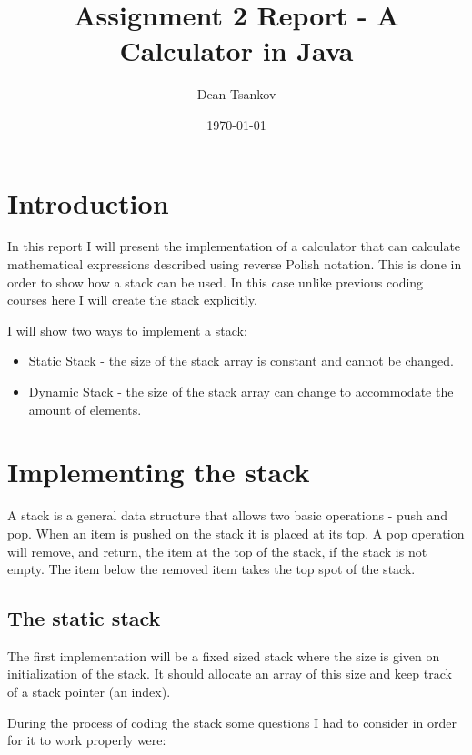 \documentclass[a4paper,11pt]{article}
\begin{document}
\title{
    \textbf{Assignment 2 Report - A Calculator
in Java}
}
\author{Dean Tsankov}
\date{\today}

\maketitle

\section*{Introduction}

In this report I will present the implementation of a calculator that can calculate mathematical expressions described using reverse Polish notation. This is done in order to show how a stack can be used. In this case unlike previous coding courses here I will create the stack explicitly.

I will show two ways to implement a stack:
\begin{itemize}
\item Static Stack - the size of the stack array is constant and cannot be changed.
\item Dynamic Stack - the size of the stack array can change to accommodate the amount of elements.
\end{itemize} 

\section*{Implementing the stack}

A stack is a general data structure that allows two basic operations - push and pop. When an item is pushed on the stack it is placed at its top. A pop operation will remove, and return, the item at the top of the stack, if the
stack is not empty. The item below the removed item takes the top spot of
the stack.

\subsection*{The static stack}

The first implementation will be a fixed sized stack where the size is given
on initialization of the stack. It should allocate an array of this size
and keep track of a stack pointer (an index).

During the process of coding the stack some questions I had to consider in order for it to work properly were:
\end{document}
